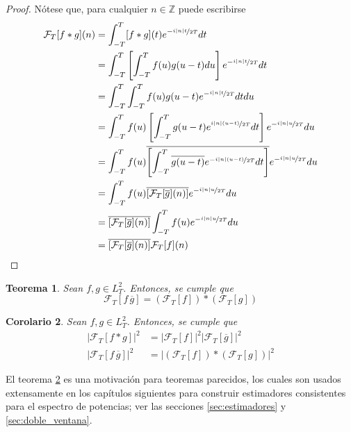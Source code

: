 \documentclass[12pt,letterpaper]{book}
\newtheorem{teorema}{Teorema}[chapter]
\newtheorem{corolario}[teorema]{Corolario}
\newcommand{\Z}{\mathbb{Z}}
\newcommand{\simint}[1]{\int_{- #1 }^{ #1 }}
\newcommand{\abso}[1]{\left| #1 \right|}
\begin{document}
\begin{proof}
Nótese que, para cualquier $n \in \Z$ puede escribirse
\begin{align*}
\mathcal{F}_T[f \ast g] (n)
&= \simint{T} [f\ast g](t) e^{-\nicefrac{ i \abso{n} t}{2T}} dt \\
&= \simint{T} \left[ \simint{T} f(u) g(u-t) du \right] e^{-\nicefrac{ i \abso{n} t}{2T}} dt \\
&= \simint{T} \simint{T} f(u) g(u-t) e^{-\nicefrac{ i \abso{n} t}{2T}} dt du \\
&= \simint{T} f(u) \left[ \simint{T} g(u-t) e^{\nicefrac{ i \abso{n} (u-t)}{2T}} dt \right] e^{-\nicefrac{ i \abso{n} u}{2T}} du \\
&= \simint{T} f(u) \overline{\left[ \simint{T} \overline{g(u-t)} e^{-\nicefrac{ i \abso{n} (u-t)}{2T}} dt \right]} e^{-\nicefrac{ i \abso{n} u}{2T}} du \\
&= \simint{T} f(u) \overline{\left[ \mathcal{F}_T[\overline{g}](n) \right]} e^{-\nicefrac{ i \abso{n} u}{2T}} du \\
&= \overline{\left[ \mathcal{F}_T[\overline{g}](n) \right]} \simint{T} f(u) e^{-\nicefrac{ i \abso{n} u}{2T}} du \\
&= \overline{\left[ \mathcal{F}_T[\overline{g}](n) \right]} \mathcal{F}_T[f] (n)
\end{align*}
\end{proof}

\begin{teorema}
Sean $f, g \in L^{2}_T$. Entonces, se cumple que
\begin{equation}
\mathcal{F}_T[ f\, \overline{g}] = \left( \mathcal{F}_T[f] \right) \ast \left( \mathcal{F}_T[g] \right)
\end{equation}
\end{teorema}

\begin{corolario}
Sean $f, g \in L^{2}_T$. Entonces, se cumple que
\begin{align}
\abso{\mathcal{F}_T[f \ast g]}^{2} &= \abso{ \mathcal{F}_T[f] }^{2} \abso{ \mathcal{F}_T[\overline{g}] }^{2} \\
\abso{\mathcal{F}_T[ f\, \overline{g}]}^{2} &= \abso{ \left( \mathcal{F}_T[f] \right) \ast \left( \mathcal{F}_T[g] \right)}^{2}
\end{align}
\label{teo:convolucion}
\end{corolario}

El teorema \ref{teo:convolucion} es una motivación para teoremas parecidos, los cuales son usados extensamente en los capítulos siguientes para construir estimadores consistentes para el espectro de potencias; ver las secciones \ref{sec:estimadores} y \ref{sec:doble_ventana}.
\end{document}
